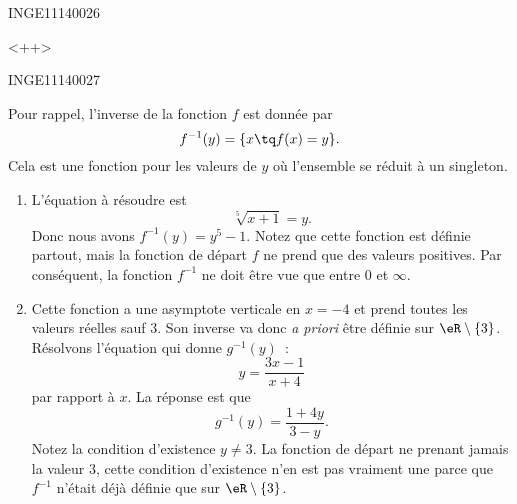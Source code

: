 \documentclass{article}
\begin{document}
\begin{corrige}{INGE11140026}

<++>

\end{corrige}%


\begin{corrige}{INGE11140027}

	Pour rappel, l'inverse de la fonction $f$ est donnée par
	\begin{equation}
		f^{-1}(y)=\{ x\tq f(x)=y \}.
	\end{equation}
	Cela est une fonction pour les valeurs de $y$ où l'ensemble se réduit à un singleton.

	\begin{enumerate}

		\item
			L'équation à résoudre est
			\begin{equation}
				\sqrt[5]{x+1}=y.
			\end{equation}
			Donc nous avons $f^{-1}(y)=y^5-1$. Notez que cette fonction est définie partout, mais la fonction de départ $f$ ne prend que des valeurs positives. Par conséquent, la fonction $f^{-1}$ ne doit être vue que entre $0$ et $\infty$.

		\item
			Cette fonction a une asymptote verticale en $x=-4$ et prend toutes les valeurs réelles sauf $3$. Son inverse va donc \emph{a priori} être définie sur $\eR\setminus\{ 3 \}$. Résolvons l'équation qui donne $g^{-1}(y)$~:
			\begin{equation}
				y=\frac{ 3x-1 }{ x+4 }
			\end{equation}
			par rapport à $x$. La réponse est que
			\begin{equation}
				g^{-1}(y)=\frac{ 1+4y }{ 3-y }.
			\end{equation}
			Notez la condition d'existence $y\neq 3$. La fonction de départ ne prenant jamais la valeur $3$, cette condition d'existence n'en est pas vraiment une parce que $f^{-1}$ n'était déjà définie que sur $\eR\setminus\{ 3 \}$.	

	\end{enumerate}
	

\end{corrige}
\end{document}

